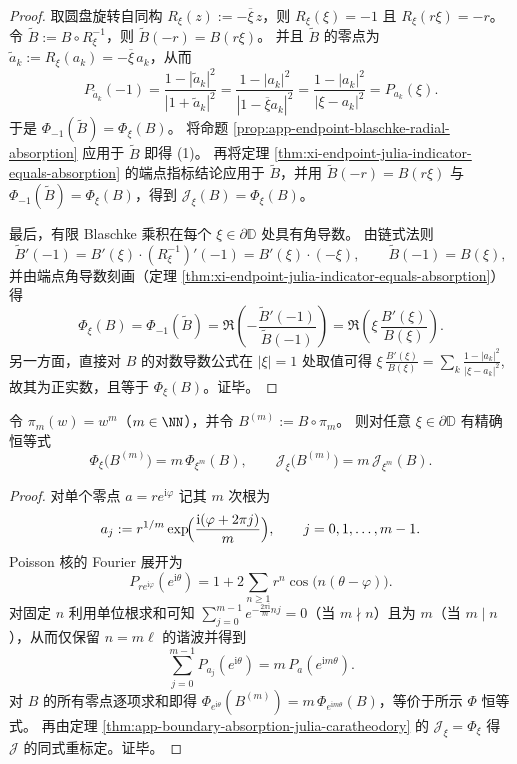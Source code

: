 \begin{proof}
取圆盘旋转自同构 \(R_{\xi}(z):=-\overline{\xi}\,z\)，则 \(R_{\xi}(\xi)=-1\) 且 \(R_{\xi}(r\xi)=-r\)。
令 \(\widetilde B:=B\circ R_{\xi}^{-1}\)，则 \(\widetilde B(-r)=B(r\xi)\)。
并且 \(\widetilde B\) 的零点为 \(\widetilde a_k:=R_{\xi}(a_k)=-\overline{\xi}\,a_k\)，从而
\[
P_{\widetilde a_k}(-1)=\frac{1-|\widetilde a_k|^2}{|1+\widetilde a_k|^2}
=\frac{1-|a_k|^2}{|1-\overline{\xi}a_k|^2}
=\frac{1-|a_k|^2}{|\xi-a_k|^2}
=P_{a_k}(\xi).
\]
于是 \(\Phi_{-1}(\widetilde B)=\Phi_{\xi}(B)\)。
将命题 \ref{prop:app-endpoint-blaschke-radial-absorption} 应用于 \(\widetilde B\) 即得 (1)。
再将定理 \ref{thm:xi-endpoint-julia-indicator-equals-absorption} 的端点指标结论应用于 \(\widetilde B\)，并用 \(\widetilde B(-r)=B(r\xi)\) 与 \(\Phi_{-1}(\widetilde B)=\Phi_{\xi}(B)\)，得到 \(\mathcal{J}_{\xi}(B)=\Phi_{\xi}(B)\)。
\par
最后，有限 Blaschke 乘积在每个 \(\xi\in\partial\mathbb{D}\) 处具有角导数。
由链式法则
\[
\widetilde B'(-1)=B'(\xi)\cdot(R_{\xi}^{-1})'(-1)=B'(\xi)\cdot(-\xi),
\qquad
\widetilde B(-1)=B(\xi),
\]
并由端点角导数刻画（定理 \ref{thm:xi-endpoint-julia-indicator-equals-absorption}）得
\[
\Phi_{\xi}(B)=\Phi_{-1}(\widetilde B)=\Re\!\left(-\frac{\widetilde B'(-1)}{\widetilde B(-1)}\right)
=\Re\!\left(\xi\,\frac{B'(\xi)}{B(\xi)}\right).
\]
另一方面，直接对 \(B\) 的对数导数公式在 \(|\xi|=1\) 处取值可得
\(
\xi\,\frac{B'(\xi)}{B(\xi)}=\sum_k\frac{1-|a_k|^2}{|\xi-a_k|^2}
\),
故其为正实数，且等于 \(\Phi_{\xi}(B)\)。证毕。
\end{proof}

\begin{corollary}[幂拉回下的吸收系数重标定]\label{cor:app-absorption-adams-boundary-rescaling}
令 \(\pi_m(w)=w^m\)（\(m\in\NN\)），并令 \(B^{(m)}:=B\circ\pi_m\)。
则对任意 \(\xi\in\partial\mathbb{D}\) 有精确恒等式
\[
\Phi_{\xi}\!\bigl(B^{(m)}\bigr)=m\,\Phi_{\xi^{m}}(B),
\qquad
\mathcal{J}_{\xi}\!\bigl(B^{(m)}\bigr)=m\,\mathcal{J}_{\xi^{m}}(B).
\]
\end{corollary}

\begin{proof}
对单个零点 \(a=re^{\mathrm{i}\varphi}\) 记其 \(m\) 次根为
\[
a_j:=r^{1/m}\exp\!\Bigl(\frac{\mathrm{i}(\varphi+2\pi j)}{m}\Bigr),
\qquad j=0,1,\dots,m-1.
\]
Poisson 核的 Fourier 展开为
\[
P_{re^{\mathrm{i}\varphi}}(e^{\mathrm{i}\theta})
=1+2\sum_{n\ge 1}r^n\cos\bigl(n(\theta-\varphi)\bigr).
\]
对固定 \(n\) 利用单位根求和可知 \(\sum_{j=0}^{m-1}e^{-\frac{2\pi\mathrm{i}}{m}nj}=0\)（当 \(m\nmid n\)）且为 \(m\)（当 \(m\mid n\)），从而仅保留 \(n=m\ell\) 的谐波并得到
\[
\sum_{j=0}^{m-1}P_{a_j}(e^{\mathrm{i}\theta})
=m\,P_{a}(e^{\mathrm{i}m\theta}).
\]
对 \(B\) 的所有零点逐项求和即得 \(\Phi_{e^{\mathrm{i}\theta}}(B^{(m)})=m\,\Phi_{e^{\mathrm{i}m\theta}}(B)\)，等价于所示 \(\Phi\) 恒等式。
再由定理 \ref{thm:app-boundary-absorption-julia-caratheodory} 的 \(\mathcal{J}_{\xi}=\Phi_{\xi}\) 得 \(\mathcal{J}\) 的同式重标定。证毕。
\end{proof}

